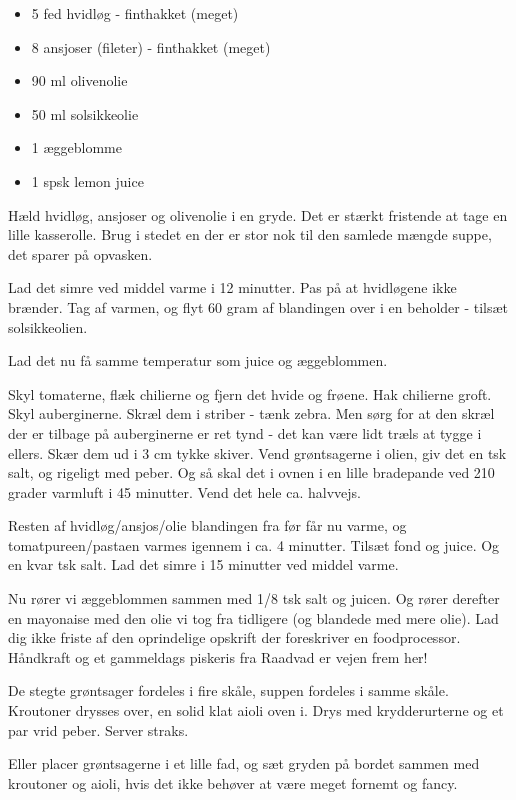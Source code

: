 \documentclass[
]{book}
\providecommand{\tightlist}{%
  \setlength{\itemsep}{0pt}\setlength{\parskip}{0pt}}
\begin{document}
\begin{itemize}
\tightlist
\item
  5 fed hvidløg - finthakket (meget)
\item
  8 ansjoser (fileter) - finthakket (meget)
\item
  90 ml olivenolie
\item
  50 ml solsikkeolie
\item
  1 æggeblomme
\item
  1 spsk lemon juice
\end{itemize}

Hæld hvidløg, ansjoser og olivenolie i en gryde. Det er stærkt fristende at tage
en lille kasserolle. Brug i stedet en der er stor nok til
den samlede mængde suppe, det sparer på opvasken.

Lad det simre ved middel varme i 12 minutter. Pas på at hvidløgene ikke brænder.
Tag af varmen, og flyt 60 gram af blandingen over i en beholder - tilsæt solsikkeolien.

Lad det nu få samme temperatur som juice og æggeblommen.

Skyl tomaterne, flæk chilierne og fjern det hvide og frøene. Hak chilierne
groft.
Skyl auberginerne. Skræl dem i striber - tænk zebra. Men sørg for at den skræl
der er tilbage på auberginerne er ret tynd - det kan være lidt træls at tygge i
ellers. Skær dem ud i 3 cm tykke skiver. Vend grøntsagerne i olien, giv det en
tsk salt, og rigeligt med peber. Og så skal det i ovnen i en lille bradepande
ved 210 grader varmluft i 45 minutter. Vend det hele ca. halvvejs.

Resten af hvidløg/ansjos/olie blandingen fra før får nu varme, og tomatpureen/pastaen
varmes igennem i ca. 4 minutter. Tilsæt fond og juice. Og en kvar tsk salt.
Lad det simre i 15 minutter ved middel varme.

Nu rører vi æggeblommen sammen med 1/8 tsk salt og juicen. Og rører derefter
en mayonaise med den olie vi tog fra tidligere (og blandede med mere olie).
Lad dig ikke friste af den oprindelige opskrift der foreskriver en foodprocessor.
Håndkraft og et gammeldags piskeris fra Raadvad er vejen frem her!

De stegte grøntsager fordeles i fire skåle,
suppen fordeles i samme skåle. Kroutoner drysses over, en solid klat aioli oven i.
Drys med krydderurterne og et par vrid peber. Server straks.

Eller placer grøntsagerne i et lille fad, og sæt gryden på bordet sammen med
kroutoner og aioli, hvis det ikke behøver at være meget fornemt og fancy.
\end{document}
